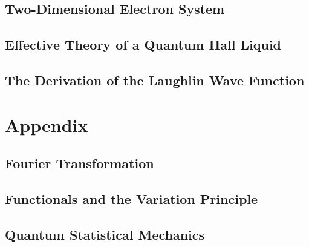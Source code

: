 \documentclass[twoside,11pt]{report}
\begin{document}
\section{Two-Dimensional Electron System}
\section{Effective Theory of a Quantum Hall Liquid}
\section{The Derivation of the Laughlin Wave Function}
\appendix
\chapter{Appendix}
\section{Fourier Transformation}
\section{Functionals and the Variation Principle}
\section{Quantum Statistical Mechanics}


\renewcommand{\bibname}{References}


\end{document}
